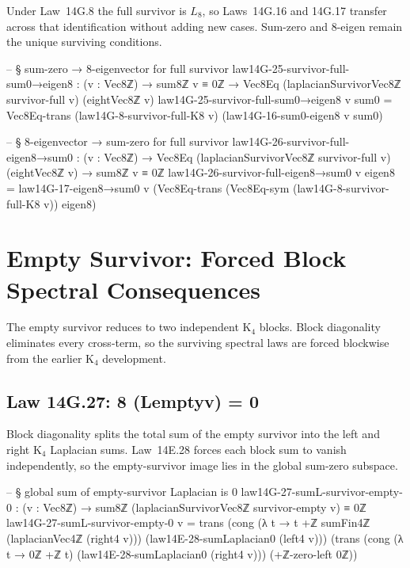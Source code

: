 \documentclass[11pt,a4paper]{book}
\def\Sigma{Sigma}%
\def\mathrm#1{#1}%
\def\texorpdfstring#1#2{#2}%
\begin{document}
Under Law~14G.8 the full survivor is $L_8$, so Laws~14G.16 and 14G.17 transfer across that identification without adding new cases. Sum-zero and $8$-eigen remain the unique surviving conditions.

\begin{code}
-- § sum-zero → 8-eigenvector for full survivor
law14G-25-survivor-full-sum0→eigen8 : (v : Vec8ℤ) → sum8ℤ v ≡ 0ℤ → Vec8Eq (laplacianSurvivorVec8ℤ survivor-full v) (eightVec8ℤ v)
law14G-25-survivor-full-sum0→eigen8 v sum0 =
  Vec8Eq-trans
    (law14G-8-survivor-full-K8 v)
    (law14G-16-sum0-eigen8 v sum0)

-- § 8-eigenvector → sum-zero for full survivor
law14G-26-survivor-full-eigen8→sum0 : (v : Vec8ℤ) → Vec8Eq (laplacianSurvivorVec8ℤ survivor-full v) (eightVec8ℤ v) → sum8ℤ v ≡ 0ℤ
law14G-26-survivor-full-eigen8→sum0 v eigen8 =
  law14G-17-eigen8→sum0 v
    (Vec8Eq-trans
      (Vec8Eq-sym (law14G-8-survivor-full-K8 v))
      eigen8)
\end{code}

\section{Empty Survivor: Forced Block Spectral Consequences}

The empty survivor reduces to two independent K$_4$ blocks.
Block diagonality eliminates every cross-term, so the surviving spectral laws are forced blockwise from the earlier K$_4$ development.

\subsection{Law 14G.27: \texorpdfstring{$\Sigma_8 (L_{\mathrm{empty}}\,v) = 0$}{8 (Lemptyv) = 0}}

Block diagonality splits the total sum of the empty survivor into the left and right K$_4$ Laplacian sums. Law~14E.28 forces each block sum to vanish independently, so the empty-survivor image lies in the global sum-zero subspace.

\begin{code}
-- § global sum of empty-survivor Laplacian is 0
law14G-27-sumL-survivor-empty-0 : (v : Vec8ℤ) → sum8ℤ (laplacianSurvivorVec8ℤ survivor-empty v) ≡ 0ℤ
law14G-27-sumL-survivor-empty-0 v =
  trans
    (cong (λ t → t +ℤ sumFin4ℤ (laplacianVec4ℤ (right4 v))) (law14E-28-sumLaplacian0 (left4 v)))
    (trans
      (cong (λ t → 0ℤ +ℤ t) (law14E-28-sumLaplacian0 (right4 v)))
      (+ℤ-zero-left 0ℤ))
\end{code}
\end{document}
